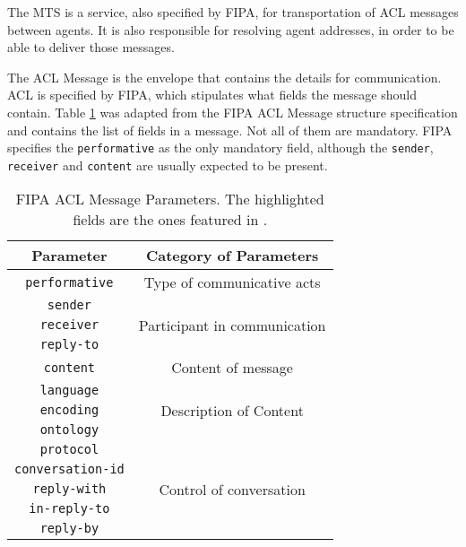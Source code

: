 The \gls{MTS} is a service, also specified by FIPA, for transportation of ACL messages between agents. It is also responsible for resolving agent addresses, in order to be able to deliver those messages.

The ACL Message is the envelope that contains the details for communication. \gls{ACL} is specified by \gls{FIPA}, which stipulates what fields the message should contain. Table \ref{tab:fipaACLMessage} was adapted from the FIPA ACL Message structure specification and contains the list of fields in a message. Not all of them are mandatory. FIPA specifies the \texttt{performative} as the only mandatory field, although the \texttt{sender}, \texttt{receiver} and \texttt{content} are usually expected to be present.

\begin{table}
	\normalsize
	\caption{FIPA ACL Message Parameters. The highlighted fields are the ones featured in \apiname{}.}
	\label{tab:fipaACLMessage}
	\begin{center}
		\begin{tabular}{c|c}
		\hline
		\textbf{Parameter} & \textbf{Category of Parameters} \\
		\hline
		\colorbox{Apricot}{\texttt{performative}} & Type of communicative acts \\
		\hline
		\colorbox{Apricot}{\texttt{sender}} & \multirow{3}{*}{Participant in communication} \\
		\cline{1-1}
		\colorbox{Apricot}{\texttt{receiver}} \\
		\cline{1-1}
		\texttt{reply-to}  \\
		\hline
		\colorbox{Apricot}{\texttt{content}} & Content of message \\
		\hline
		\texttt{language} & \multirow{3}{*}{Description of Content} \\
		\cline{1-1}
		\texttt{encoding} \\
		\cline{1-1}
		\colorbox{Apricot}{\texttt{ontology}} \\
		\hline
		\colorbox{Apricot}{\texttt{protocol}} & \multirow{5}{*}{Control of conversation} \\
		\cline{1-1}
		\colorbox{Apricot}{\texttt{conversation-id}} \\
		\cline{1-1}
		\texttt{reply-with} \\
		\cline{1-1}
		\texttt{in-reply-to} \\
		\cline{1-1}
		\colorbox{Apricot}{\texttt{reply-by}} \\
		\hline
		\end{tabular}
	\end{center}
\end{table} 

